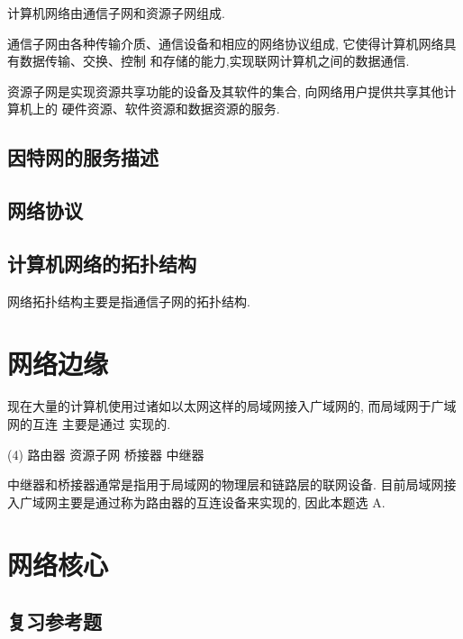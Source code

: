 \documentclass[10pt,UTF8]{book} %
\begin{document}
计算机网络由通信子网和资源子网组成.

通信子网由各种传输介质、通信设备和相应的网络协议组成, 它使得计算机网络具有数据传输、交换、控制
和存储的能力,实现联网计算机之间的数据通信.

资源子网是实现资源共享功能的设备及其软件的集合, 向网络用户提供共享其他计算机上的
硬件资源、软件资源和数据资源的服务.
\subsection{因特网的服务描述}
\subsection{网络协议}

\subsection{计算机网络的拓扑结构}

网络拓扑结构主要是指通信子网的拓扑结构.

\section{网络边缘}

\begin{example}
    现在大量的计算机使用过诸如以太网这样的局域网接入广域网的, 而局域网于广域网的互连
    主要是通过 \underline{\qquad \qquad \qquad} 实现的.
    \begin{tasks}[label={\Alph*.}](4)
        \task 路由器
        \task 资源子网
        \task 桥接器
        \task 中继器
    \end{tasks}
    \begin{cmt}
        中继器和桥接器通常是指用于局域网的物理层和链路层的联网设备.
        目前局域网接入广域网主要是通过称为路由器的互连设备来实现的, 因此本题选 A.
    \end{cmt}
\end{example}

\section{网络核心}

\subsection{复习参考题}
\end{document}
